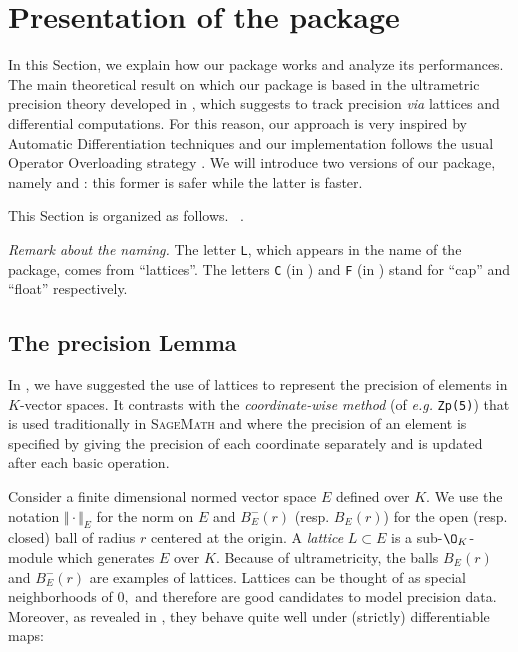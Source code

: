 \documentclass[sigconf]{acmart}
\newcommand{\sage}{\textsc{SageMath}\xspace}
\newcommand{\ZpL}{\text{\rm \tt ZpL}\xspace}
\newcommand{\ZpLC}{\text{\rm \tt ZpLC}\xspace}
\newcommand{\ZpLF}{\text{\rm \tt ZpLF}\xspace}
\def\todo#1{\ \!\!{\color{red} #1}}
\theoremstyle{definition}
\begin{document}
\section{Presentation of the package}

In this Section, we explain how our package \ZpL works and analyze
its performances.
The main theoretical result on which our package is based in the 
ultrametric precision theory developed in \cite{padicprec}, which 
suggests to track precision \emph{via} lattices and differential 
computations. For this reason, our approach is very inspired by 
Automatic Differentiation techniques \cite{} and our implementation 
follows the usual Operator Overloading strategy \cite{}.
We will introduce two versions of our package, namely \ZpLC and \ZpLF: 
this former is safer while the latter is faster.

This Section is organized as follows.
\todo{[...]}.

\smallskip

\noindent \textit{Remark about the naming.}
%
The letter \texttt{L}, which appears in the name of the package, 
comes from ``lattices''. The letters \texttt{C} (in \ZpLC) and 
\texttt{F} (in \ZpLF) stand for ``cap'' and ``float'' respectively.

\subsection{The precision Lemma}
\label{ssec:preclemma}

In \cite{caruso-roe-vaccon:14a}, we have suggested the 
use of lattices to represent the precision of elements in 
$K$-vector spaces.  It contrasts with the
\emph{coordinate-wise method} (of \textit{e.g.}
 \verb?Zp(5)?) that is used traditionally in \sage and
where the precision of an element is specified by giving the precision
of each coordinate separately and is updated after each basic
operation.

Consider a finite 
dimensional normed vector space $E$ 
defined over $K$. 
We use the notation $\Vert \cdot \Vert_E$ for the norm 
on $E$ and $B^-_E(r)$ (resp. $B^{\phantom -}_E(r)$) for the open (resp. 
closed) ball of radius $r$ centered at the origin. A \emph{lattice} $L \subset 
E$ is a sub-$\O_K$-module which generates $E$ over $K$. 
Because of ultrametricity, the balls $B^{\phantom 
-}_E(r)$ and $B^-_E(r)$ are examples of lattices. 
Lattices can be thought of as special neighborhoods of $0,$
 and therefore are good 
candidates to model precision data. Moreover, as revealed in 
\cite{caruso-roe-vaccon:14a}, they behave quite well under (strictly) 
differentiable maps:
\end{document}

